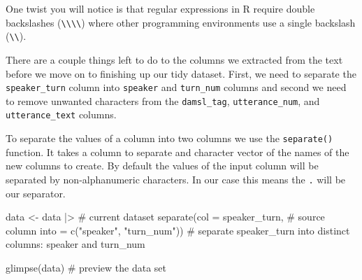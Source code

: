 \documentclass[
  letterpaper,
]{latex/krantz}
\newenvironment{Shaded}{\begin{snugshade}}{\end{snugshade}}
\newcommand{\AttributeTok}[1]{\textcolor[rgb]{0.40,0.45,0.13}{#1}}
\newcommand{\CommentTok}[1]{\textcolor[rgb]{0.37,0.37,0.37}{#1}}
\newcommand{\FunctionTok}[1]{\textcolor[rgb]{0.28,0.35,0.67}{#1}}
\newcommand{\NormalTok}[1]{\textcolor[rgb]{0.00,0.23,0.31}{#1}}
\newcommand{\OtherTok}[1]{\textcolor[rgb]{0.00,0.23,0.31}{#1}}
\newcommand{\SpecialCharTok}[1]{\textcolor[rgb]{0.37,0.37,0.37}{#1}}
\newcommand{\StringTok}[1]{\textcolor[rgb]{0.13,0.47,0.30}{#1}}
\begin{document}
\begin{tcolorbox}[enhanced jigsaw, toprule=.15mm, bottomtitle=1mm, coltitle=black, title=\textcolor{quarto-callout-warning-color}{\faExclamationTriangle}\hspace{0.5em}{Tip}, left=2mm, colframe=quarto-callout-warning-color-frame, bottomrule=.15mm, colbacktitle=quarto-callout-warning-color!10!white, leftrule=.75mm, colback=white, titlerule=0mm, breakable, toptitle=1mm, opacityback=0, arc=.35mm, rightrule=.15mm, opacitybacktitle=0.6]

One twist you will notice is that regular expressions in R require
double backslashes
(\texttt{\textbackslash{}\textbackslash{}\textbackslash{}\textbackslash{}})
where other programming environments use a single backslash
(\texttt{\textbackslash{}\textbackslash{}}).

\end{tcolorbox}

There are a couple things left to do to the columns we extracted from
the text before we move on to finishing up our tidy dataset. First, we
need to separate the \texttt{speaker\_turn} column into \texttt{speaker}
and \texttt{turn\_num} columns and second we need to remove unwanted
characters from the \texttt{damsl\_tag}, \texttt{utterance\_num}, and
\texttt{utterance\_text} columns.

To separate the values of a column into two columns we use the
\texttt{separate()} function. It takes a column to separate and
character vector of the names of the new columns to create. By default
the values of the input column will be separated by non-alphanumeric
characters. In our case this means the \texttt{.} will be our separator.

\begin{Shaded}
\begin{Highlighting}[]
\NormalTok{data }\OtherTok{\textless{}{-}}
\NormalTok{  data }\SpecialCharTok{|\textgreater{}} \CommentTok{\# current dataset}
  \FunctionTok{separate}\NormalTok{(}\AttributeTok{col =}\NormalTok{ speaker\_turn, }\CommentTok{\# source column}
           \AttributeTok{into =} \FunctionTok{c}\NormalTok{(}\StringTok{"speaker"}\NormalTok{, }\StringTok{"turn\_num"}\NormalTok{)) }\CommentTok{\# separate speaker\_turn into distinct columns: speaker and turn\_num}

\FunctionTok{glimpse}\NormalTok{(data) }\CommentTok{\# preview the data set}
\end{Highlighting}
\end{Shaded}
\end{document}
